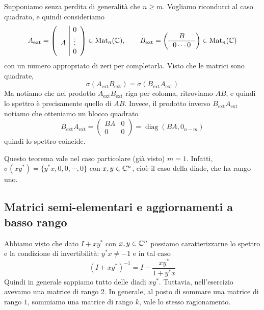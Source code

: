 \documentclass[a4paper]{article}
\begin{document}
\begin{snippetproof}{}
    Supponiamo senza perdita di generalità che \(n \geq m\).
    Vogliamo ricondurci al caso quadrato, e quindi consideriamo
    \[
        A_{\text{ext}}=
        \left(
            \begin{array}{c|c}
                & 0 \\
                A & \vdots \\
                & 0
            \end{array}
        \right)
        \in \matrices_{n}(\complexnumbers),
        \qquad
        B_{\text{ext}}=
        \left(
            \begin{array}{ccc}
                & B & \\ \hline
                \multicolumn{3}{c}{0 \cdots 0}
            \end{array}
        \right)
        \in \matrices_{n}(\complexnumbers)
    \]
    con un numero appropriato di zeri per completarla.
    Visto che le matrici sono quadrate,
    \[
        \sigma(A_{\text{ext}}B_{\text{ext}})
        = \sigma(B_{\text{ext}}A_{\text{ext}})
    \]
    Ma notiamo che nel prodotto \(A_{\text{ext}}B_{\text{ext}}\) riga per colonna, ritroviamo \(AB\),
    e quindi lo spettro è precisamente quello di \(AB\).
    Invece, il prodotto inverso \(B_{\text{ext}}A_{\text{ext}}\)
    notiamo che otteniamo un blocco quadrato \[
        B_{\text{ext}}A_{\text{ext}} =
        \left(
            \begin{array}{c|c}
                BA & 0 \\
                \hline
                0 & 0
            \end{array}
        \right)
        = \operatorname{diag}(BA, 0_{n-m})
    \]
    quindi lo spettro coincide.
\end{snippetproof}

Questo teorema vale nel caso particolare (già visto)
\(m=1\). Infatti, \(\sigma(xy^*) = \{y^*x, 0, 0, \cdots, 0\}\)
con \(x,y \in \mathbb{C}^n\), cioè il caso della diade, che ha rango uno.

\subsection{Matrici semi-elementari e aggiornamenti a basso rango}

Abbiamo visto che dato \(I + xy^*\)
con \(x,y \in \mathbb{C}^n\)
possiamo caratterizzarne lo spettro e la condizione di invertibilità:
\(y^*x \neq -1\) e in tal caso
\[
    \left(I + xy^*\right)^{-1} = I - \frac{xy^*}{1 + y^*x}
\]
Quindi in generale sappiamo tutto delle diadi \(xy^*\).
Tuttavia, nell'esercizio avevamo una matrice di rango 2.
In generale, al posto di sommare una matrice di rango \(1\),
sommiamo una matrice di rango \(k\), vale lo stesso ragionamento.
\end{document}
